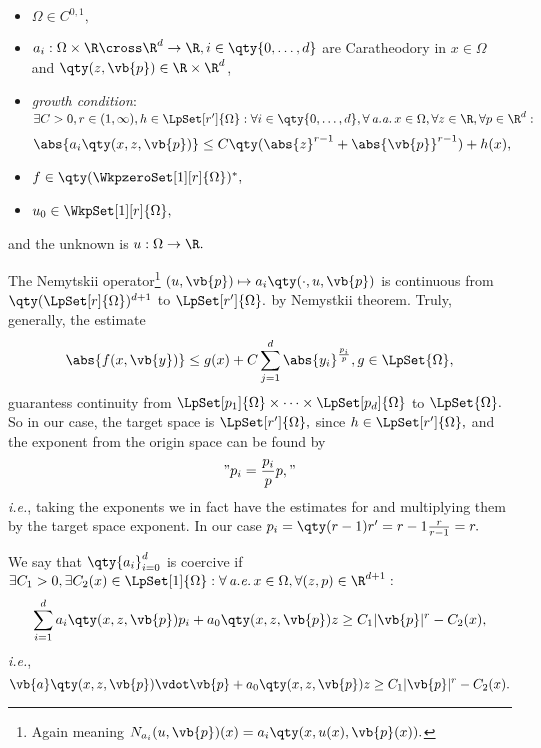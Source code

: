\begin{itemize}
	\item $\Omega \in C^{0,1},$
	\item $a_i: \Omega \times \R \cross \R^d \to \R, i \in \qty{0,\dots,d}$ are Caratheodory in $x \in \Omega$ and $\qty(z, \vb{p}) \in \R \times \R^d$,
		\item \textit{growth condition}: $\exists C>0, r \in (1,\infty), h \in \LpSet[r']{\Omega}: \forall i \in \qty{0, \dots, d}, \forall  \, \text{\textit{a.a.}} \, x\in \Omega, \forall z \in \R, \forall p \in \R^d:$
			\[
				\abs{a_i\qty(x,z,\vb{p})} \leq C\qty(\abs{z}^{r-1}+\abs{\vb{p}}^{r-1})+h(x),
			\]
		\item $f \in \qty(\WkpzeroSet[1][r]{\Omega})^{*},$
		\item $u_0 \in \WkpSet[1][r]{\Omega},$
\end{itemize}
and the unknown is $u: \Omega \to \R.$
\begin{remark}
	The Nemytskii operator\footnote{Again meaning $N_{a_i}(u,\vb{p})(x) = a_i\qty(x, u(x), \vb{p}(x)).$} $(u,\vb{p}) \mapsto a_i\qty(\cdot, u, \vb{p})$ is continuous from $\qty(\LpSet[r]{\Omega})^{d+1}$ to $\LpSet[r']{\Omega}.$ by Nemystkii theorem. Truly, generally, the estimate
	\[
		\abs{f(x,\vb{y})} \leq g(x) + C \sum_{j=1}^d \abs{y_i}^{\frac{p_i}{p}}, g \in \LpSet{\Omega},
	\]
	guarantess continuity from $\LpSet[p_1]{\Omega} \times \dots \times \LpSet[p_d]{\Omega}$ to $\LpSet{\Omega}.$ So in our case, the target space is $\LpSet[r']{\Omega},$ since $h \in \LpSet[r']{\Omega},$ and the exponent from the origin space can be found by
	\[
		"p_i = \frac{p_i}{p} p,"
	\]
	\textit{i.e.}, taking the exponents we in fact have the estimates for and multiplying them by the target space exponent. In our case $p_i = \qty(r-1)r' = r-1 \frac{r}{r-1} = r.$ 
\end{remark}


\begin{definition}[Coercivity]
	We say that $\qty{a_i}_{i=0}^d$ is coercive if $\exists C_1 > 0, \exists C_2(x) \in \LpSet[1]{\Omega}: \forall \, \text{\textit{a.e.}} \, x \in \Omega, \forall (z,p) \in \R^{d+1}:$
	\[
		\sum_{i=1}^d a_i\qty(x,z,\vb{p})p_i + a_0\qty(x,z,\vb{p})z \geq C_1 |\vb{p}|^r-C_2(x), 
	\]
	\textit{i.e.},
	\[
		\vb{a}\qty(x,z,\vb{p}) \vdot \vb{p} + a_0\qty(x,z,\vb{p})z \geq C_1 |\vb{p}|^r - C_2(x).
	\]

\end{definition}

